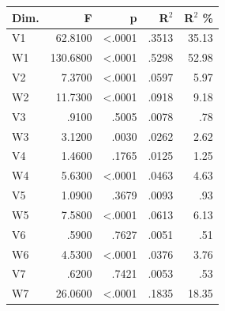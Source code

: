 \begin{table}
\begin{tabular}{lrrrr}
\toprule
Dim. & F & p & R$^2$ & R$^2$ \% \\
\midrule
V1 & 62.8100 & <.0001 & .3513 & 35.13 \\
W1 & 130.6800 & <.0001 & .5298 & 52.98 \\
V2 & 7.3700 & <.0001 & .0597 & 5.97 \\
W2 & 11.7300 & <.0001 & .0918 & 9.18 \\
V3 & .9100 & .5005 & .0078 & .78 \\
W3 & 3.1200 & .0030 & .0262 & 2.62 \\
V4 & 1.4600 & .1765 & .0125 & 1.25 \\
W4 & 5.6300 & <.0001 & .0463 & 4.63 \\
V5 & 1.0900 & .3679 & .0093 & .93 \\
W5 & 7.5800 & <.0001 & .0613 & 6.13 \\
V6 & .5900 & .7627 & .0051 & .51 \\
W6 & 4.5300 & <.0001 & .0376 & 3.76 \\
V7 & .6200 & .7421 & .0053 & .53 \\
W7 & 26.0600 & <.0001 & .1835 & 18.35 \\
\bottomrule
\end{tabular}
\end{table}
